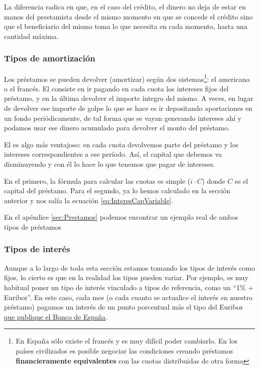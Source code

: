 \documentclass[nochap,palatino,shortheader]{apuntes}
\begin{document}
La diferencia radica en que, en el caso del crédito, el dinero no deja de estar en manos del prestamista desde el mismo momento en que se concede el crédito sino que el beneficiario del mismo toma lo que necesita en cada momento, hasta una cantidad máxima.

\subsubsection{Tipos de amortización}

Los préstamos se pueden devolver (amortizar) según dos sistemas\footnote{En España sólo existe el francés y es muy difícil poder cambiarlo. En los países civilizados es posible negociar las condiciones creando préstamos \textbf{financieramente equivalentes} con las cuotas distribuidas de otra forma}: el americano o el francés. El  consiste en ir pagando en cada cuota los intereses fijos del préstamo, y en la última devolver el importe íntegro del mismo. A veces, en lugar de devolver ese importe de golpe lo que se hace es ir depositando aportaciones en un fondo periódicamente, de tal forma que se vayan generando intereses ahí y podamos usar ese dinero acumulado para devolver el monto del préstamo.

El  es algo más ventajoso: en cada cuota devolvemos parte del préstamo y los intereses correspondientes a ese período. Así, el capital que debemos va disminuyendo y con él lo hace lo que tenemos que pagar de intereses.

En el primero, la fórmula para calcular las cuotas es simple ($i·C$) donde $C$ es el capital del préstamo. Para el segundo, ya lo hemos calculado en la sección anterior y nos salía la ecuación \eqref{eq:InteresCapVariable}.

En el apéndice \ref{sec:Prestamos} podemos encontrar un ejemplo real de ambos tipos de préstamos

\subsubsection{Tipos de interés}\label{sec:TiposInteres}

Aunque a lo largo de toda esta sección estamos tomando los tipos de interés como fijos, lo cierto es que en la realidad los tipos pueden variar. Por ejemplo, es muy habitual poner un tipo de interés vinculado a tipos de referencia, como un ``1\% + Euribor''. En este caso, cada mes (o cada cuanto se actualice el interés en nuestro préstamo) pagamos un interés de un punto porcentual más el tipo del Euribor \href{http://www.bde.es/clientebanca/es/areas/Tipos_de_Interes/Tipos_de_interes/}{que publique el Banco de España}.
\end{document}
